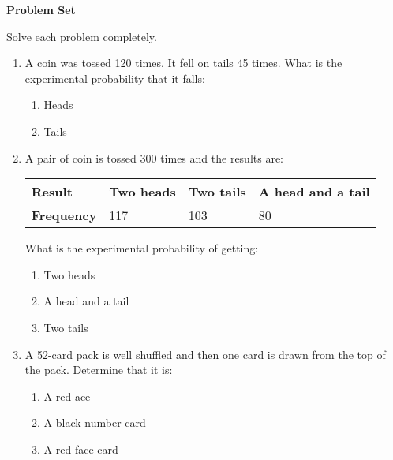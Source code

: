 \textbf{Problem Set}

\vspce

Solve each problem completely.

\begin{enumerate}[label = \arabic*. ]
\item A coin was tossed 120 times. It fell on tails 45 times. What is the experimental probability that it falls: 
\begin{enumerate}[label = \alph*. ]
\item \hspce  Heads
\item \hspce  Tails
\end{enumerate}   
\item A pair of coin is tossed 300 times and the results are:

\begin{center}
\noindent\begin{minipage}{\textwidth}
\begin{tabularx}{\textwidth}{|Y|Y|Y|Y|}
\hline
\textbf{Result} & Two heads & Two tails & A head and a tail\\
\hline
\textbf{Frequency} & 117 & 103 & 80\\
\hline
\end{tabularx} 
\end{minipage}
\end{center} 

What is the experimental probability of getting: 
\begin{enumerate}[label = \alph*. ]
\item \hspce  Two heads 
\item \hspce  A head and a tail
\item \hspce  Two tails
\end{enumerate} 

\item A 52-card pack is well shuffled and then one card is drawn from the top of the pack. Determine that it is: 
\begin{enumerate}[label = \alph*. ]
\item \hspce  A red ace
\item  \hspce A black number card 
\item \hspce  A red face card
\end{enumerate} 

\end{enumerate}  
